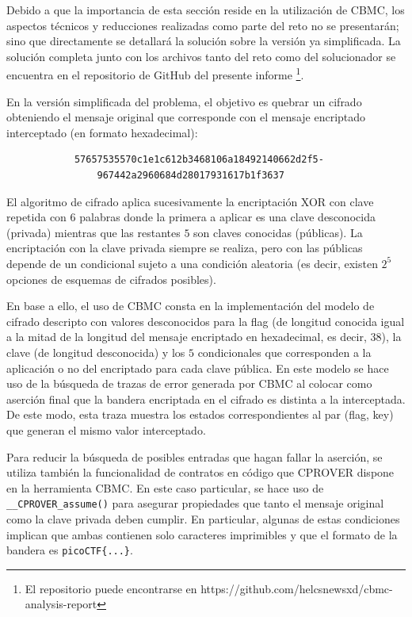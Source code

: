 \documentclass[runningheads]{llncs}
\begin{document}
Debido a que la importancia de esta sección reside en la utilización de CBMC, los aspectos técnicos y reducciones realizadas como parte del reto no se presentarán; sino que directamente se detallará la solución sobre la versión ya simplificada.
La solución completa junto con los archivos tanto del reto como del solucionador se encuentra en el repositorio de GitHub del presente informe \footnote[4]{El repositorio puede encontrarse en https://github.com/helcsnewsxd/cbmc-analysis-report}.

En la versión simplificada del problema, el objetivo es quebrar un cifrado obteniendo el mensaje original que corresponde con el mensaje encriptado interceptado (en formato hexadecimal):
\begin{verbatim}
            57657535570c1e1c612b3468106a18492140662d2f5-
                967442a2960684d28017931617b1f3637
\end{verbatim}

El algoritmo de cifrado aplica sucesivamente la encriptación XOR con clave repetida con $6$ palabras donde la primera a aplicar es una clave desconocida (privada) mientras que las restantes $5$ son claves conocidas (públicas).
La encriptación con la clave privada siempre se realiza, pero con las públicas depende de un condicional sujeto a una condición aleatoria (es decir, existen $2^5$ opciones de esquemas de cifrados posibles).

En base a ello, el uso de CBMC consta en la implementación del modelo de cifrado descripto con valores desconocidos para la flag (de longitud conocida igual a la mitad de la longitud del mensaje encriptado en hexadecimal, es decir, $38$), la clave (de longitud desconocida) y los $5$ condicionales que corresponden a la aplicación o no del encriptado para cada clave pública.
En este modelo se hace uso de la búsqueda de trazas de error generada por CBMC al colocar como aserción final que la bandera encriptada en el cifrado es distinta a la interceptada.
De este modo, esta traza muestra los estados correspondientes al par (flag, key) que generan el mismo valor interceptado.

Para reducir la búsqueda de posibles entradas que hagan fallar la aserción, se utiliza también la funcionalidad de contratos en código que CPROVER dispone en la herramienta CBMC.
En este caso particular, se hace uso de \verb|__CPROVER_assume()| para asegurar propiedades que tanto el mensaje original como la clave privada deben cumplir.
En particular, algunas de estas condiciones implican que ambas contienen solo caracteres imprimibles y que el formato de la bandera es \verb|picoCTF{...}|.
\end{document}
